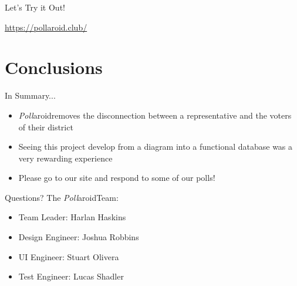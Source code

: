 \documentclass[11pt,aps,prb,groupedaddress,nofootinbib,floatfix]{beamer}
\newcommand{\pollaroid}{\emph{Poll}aroid}
\begin{document}
\begin{frame}{Let's Try it Out!}
\begin{center}
\url{https://pollaroid.club/} 
\end{center}
\end{frame}

\section{Conclusions}

\begin{frame}{In Summary...}
\begin{itemize}
	\item \pollaroid removes the disconnection between a representative and the voters of their district
	\item Seeing this project develop from a diagram into a functional database was a very rewarding experience
	\item Please go to our site and respond to some of our polls!
\end{itemize}
\end{frame}

\begin{frame}{Questions?}
The \pollaroid Team:
\begin{itemize}
	\item Team Leader: Harlan Haskins
	\item Design Engineer: Joshua Robbins
	\item UI Engineer: Stuart Olivera
	\item Test Engineer: Lucas Shadler
\end{itemize}
\end{frame}
\end{document}
